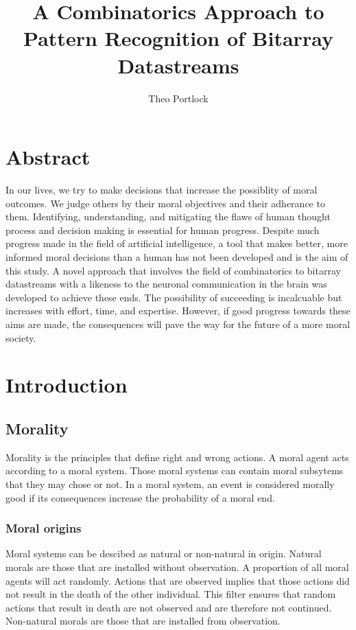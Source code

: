 \documentclass{book}
\title{A Combinatorics Approach to Pattern Recognition of Bitarray Datastreams}
\author{Theo Portlock}
\begin{document}
\frontmatter
\maketitle

\chapter{Abstract}
In our lives, we try to make decisions that increase the possiblity of moral outcomes.
We judge others by their moral objectives and their adherance to them.
Identifying, understanding, and mitigating the flaws of human thought process and decision making is essential for human progress.
Despite much progress made in the field of artificial intelligence, a tool that makes better, more informed moral decisions than a human has not been developed and is the aim of this study.
A novel approach that involves the field of combinatorics to bitarray datastreams with a likeness to the neuronal communication in the brain was developed to achieve these ends.
The possibility of succeeding is incalcuable but increases with effort, time, and expertise.
However, if good progress towards these aims are made, the consequences will pave the way for the future of a more moral society.

\cleardoublepage
{}
{}
\tableofcontents

\cleardoublepage
{}
{}
\listoffigures

\cleardoublepage
{}
{}
\listoftables

\mainmatter
\chapter{Introduction}
\section{Morality}
Morality is the principles that define right and wrong actions.
A moral agent acts according to a moral system.
Those moral systems can contain moral subsytems that they may chose or not.
In a moral system, an event is considered morally good if its consequences increase the probability of a moral end.

\subsection{Moral origins}
Moral systems can be descibed as natural or non-natural in origin.
Natural morals are those that are installed without observation.
A proportion of all moral agents will act randomly.
Actions that are observed implies that those actions did not result in the death of the other individual.
This filter ensures that random actions that result in death are not observed and are therefore not continued.
Non-natural morals are those that are installed from observation.
\end{document}

